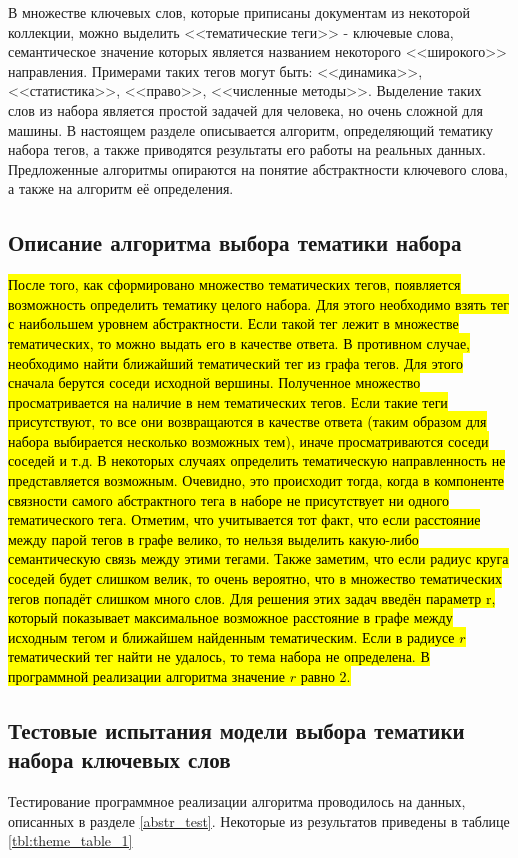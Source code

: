 В множестве ключевых слов, которые приписаны документам из некоторой коллекции, можно выделить <<тематические теги>> - ключевые слова, семантическое значение которых является названием некоторого <<широкого>> направления. Примерами таких тегов могут быть: <<динамика>>, <<статистика>>, <<право>>, <<численные методы>>. Выделение таких слов из набора является простой задачей для человека, но очень сложной для машины. В настоящем разделе описывается алгоритм, определяющий тематику набора тегов, а также приводятся результаты его работы на реальных данных. Предложенные алгоритмы опираются на понятие абстрактности ключевого слова, а также на алгоритм её определения.


\subsection{Описание алгоритма выбора тематики набора}
\hl{После того, как сформировано множество тематических тегов, появляется возможность определить тематику целого набора. Для этого необходимо взять тег с наибольшем уровнем абстрактности. Если такой тег лежит в множестве тематических, то можно выдать его в качестве ответа. В противном случае, необходимо найти ближайший тематический тег из графа тегов. Для этого сначала берутся соседи исходной вершины. Полученное множество просматривается на наличие в нем тематических тегов. Если такие теги присутствуют, то все они возвращаются в качестве ответа (таким образом для набора выбирается несколько возможных тем), иначе просматриваются соседи соседей и т.д. В некоторых случаях определить тематическую направленность не представляется возможным. Очевидно, это происходит тогда, когда в компоненте связности самого абстрактного тега в наборе не присутствует ни одного тематического тега.  Отметим, что учитывается тот факт, что если расстояние между парой тегов в графе велико, то нельзя выделить какую-либо семантическую связь между этими тегами. Также заметим, что если радиус круга соседей будет слишком велик, то очень вероятно, что в множество тематических тегов попадёт слишком много слов. Для решения этих задач введён параметр r, который показывает максимальное возможное расстояние в графе между исходным тегом и ближайшем найденным тематическим. Если в радиусе $r$ тематический тег найти не удалось, то тема набора не определена. В программной реализации алгоритма значение $r$ равно 2.}

\subsection{Тестовые испытания модели выбора тематики набора ключевых слов}
Тестирование программное реализации алгоритма проводилось на данных, описанных в разделе \ref{abstr_test}. Некоторые из результатов приведены в таблице \ref{tbl:theme_table_1}

